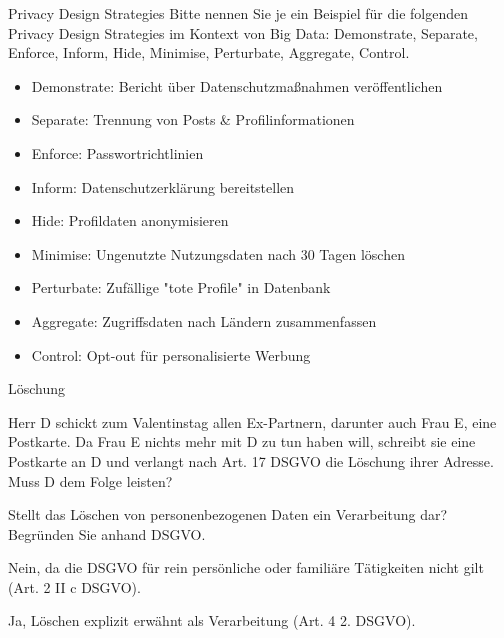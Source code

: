 \documentclass{article}
\begin{document}
\begin{exercise}{Privacy Design Strategies}
  Bitte nennen Sie je ein Beispiel für die folgenden Privacy Design Strategies im Kontext von Big Data: Demonstrate, Separate, Enforce, Inform, Hide, Minimise, Perturbate, Aggregate, Control.

  \begin{solution}
    \begin{itemize}
      \item Demonstrate: Bericht über Datenschutzmaßnahmen veröffentlichen
      \item Separate: Trennung von Posts \& Profilinformationen
      \item Enforce: Passwortrichtlinien
      \item Inform: Datenschutzerklärung bereitstellen
      \item Hide: Profildaten anonymisieren
      \item Minimise: Ungenutzte Nutzungsdaten nach 30 Tagen löschen
      \item Perturbate: Zufällige "tote Profile" in Datenbank
      \item Aggregate: Zugriffsdaten nach Ländern zusammenfassen
      \item Control: Opt-out für personalisierte Werbung
    \end{itemize}
  \end{solution}
\end{exercise}

\begin{exercises}{Löschung}
\item Herr D schickt zum Valentinstag allen Ex-Partnern, darunter auch Frau E, eine Postkarte. Da Frau E nichts mehr mit D zu tun haben will, schreibt sie eine Postkarte an D und verlangt nach Art. 17 DSGVO die Löschung ihrer Adresse. Muss D dem Folge leisten?
\item Stellt das Löschen von personenbezogenen Daten ein Verarbeitung dar? Begründen Sie anhand DSGVO.
\end{exercises}

\begin{solutions}
  \item Nein, da die DSGVO für rein persönliche oder familiäre Tätigkeiten nicht gilt (Art. 2 II c DSGVO).
  \item Ja, Löschen explizit erwähnt als Verarbeitung (Art. 4 2. DSGVO).
\end{solutions}
\end{document}
